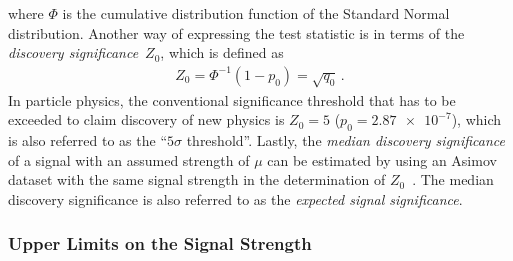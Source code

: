 where $\Phi$ is the cumulative distribution function of the Standard Normal
distribution. Another way of expressing the test statistic is in terms of the
\emph{discovery significance}~$Z_0$, which is defined as~\cite{Cowan:2010js}
\begin{align*}
  Z_0 = \Phi^{-1}(1 - p_0) = \sqrt{q_{0}} \,\text{.}
\end{align*}
In particle physics, the conventional significance threshold that has to be
exceeded to claim discovery of new physics is $Z_0 = 5$ ($p_0 = \num{2.87e-7}$),
which is also referred to as the ``$5\sigma$ threshold''. Lastly, the
\emph{median discovery significance} of a signal with an assumed strength of
$\mu$ can be estimated by using an Asimov dataset with the same signal strength
in the determination of $Z_0$~\cite{Cowan:2010js}. The median discovery
significance is also referred to as the \emph{expected signal significance}.

\subsubsection{Upper Limits on the Signal Strength}

